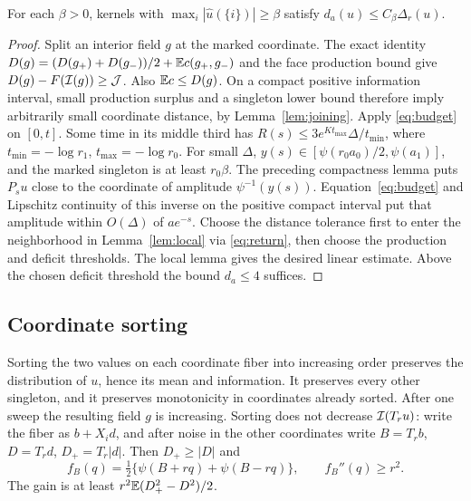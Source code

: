 \begin{lemma}\label{lem:marked}
For each $\beta>0$, kernels with
$\max_i|\widehat u(\{i\})|\ge\beta$ satisfy
$d_a(u)\le C_\beta\Delta_r(u)$.
\end{lemma}
\begin{proof}
Split an interior field $g$ at the marked coordinate. The exact identity
$D(g)=(D(g_+)+D(g_-))/2+\mathbb E c(g_+,g_-)$ and the face production
bound give $D(g)-F(\mathcal I(g))\ge\mathcal J$.
Also $\mathbb E c\le D(g)$. On a compact positive information interval,
small production surplus and a singleton lower bound therefore imply
arbitrarily small coordinate distance, by Lemma~\ref{lem:joining}.
Apply \eqref{eq:budget} on $[0,t]$. Some time in its middle third
has $R(s)\le3e^{Kt_{\max}}\Delta/t_{\min}$, where
$t_{\min}=-\log r_1$, $t_{\max}=-\log r_0$.
For small $\Delta$, $y(s)\in[\psi(r_0a_0)/2,\psi(a_1)]$,
and the marked singleton is at least $r_0\beta$.
The preceding compactness lemma puts $P_su$ close to the coordinate
of amplitude $\psi^{-1}(y(s))$. Equation~\eqref{eq:budget} and
Lipschitz continuity of this inverse on the positive compact interval
put that amplitude within $O(\Delta)$ of $ae^{-s}$.
Choose the distance tolerance first to enter the neighborhood in
Lemma~\ref{lem:local} via \eqref{eq:return}, then choose the production
and deficit thresholds. The local lemma gives the desired linear estimate.
Above the chosen deficit threshold the bound $d_a\le4$ suffices.
\end{proof}

\subsection{Coordinate sorting}
Sorting the two values on each coordinate fiber into increasing order
preserves the distribution of $u$, hence its mean and information.
It preserves every other singleton, and it preserves monotonicity in
coordinates already sorted. After one sweep the resulting field $g$
is increasing. Sorting does not decrease $\mathcal I(T_ru)$: write the fiber
as $b+X_id$, and after noise in the other coordinates write
$B=T_rb$, $D=T_rd$, $D_+=T_r|d|$. Then $D_+\ge|D|$ and
\[
 f_B(q)=\tfrac12\{\psi(B+rq)+\psi(B-rq)\},\qquad f_B''(q)\ge r^2.
\]
The gain is at least $r^2\mathbb E(D_+^2-D^2)/2$.

